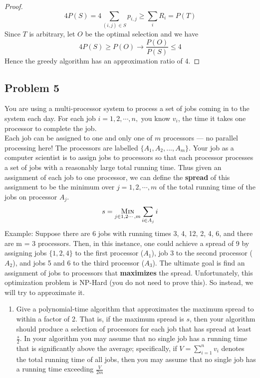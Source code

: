 \documentclass[11pt]{article}
\begin{document}
\begin{enumerate}
\begin{proof}
        \[
            4P(S) = 4\sum_{(i,j)\in S} p_{i,j} \geq \sum_{i} R_i = P(T)
        \]
        Since $T$ is arbitrary, let $O$ be the optimal selection and we have 
        \[
            4P(S) \geq P(O) \to \frac{P(O)}{P(S)} \leq 4
        \]
        Hence the greedy algorithm has an approximation ratio of 4.
    \end{proof}
\end{enumerate}


\subsection*{Problem 5}


You are using a multi-processor system to process a set of jobs coming in to the system each day. For each job $i = 1,2,\cdots ,n,$ you know $v_i$, the time it takes one processor to complete the job. \\ 
Each job can be assigned to one and only one of $m$ processors — no parallel processing here! The processors are labelled $\{A_1,A_2,...,A_m\}$. Your job as a computer scientist is to assign jobs to processors so that each processor processes a set of jobs with a reasonably large total running time. Thus given an assignment of each job to one processor, we can define the \textbf{spread} of this assignment to be the minimum over $j = 1,2,\cdots ,m$ of the total running time of the jobs on processor $A_j$.
\[
    s = \underset{j\in 1,2\cdots, m}{\textsc{Min}} \sum_{i\in A_j} i
\]
Example: Suppose there are 6 jobs with running times 3, 4, 12, 2, 4, 6, and there are m = 3 processors. Then, in this instance, one could achieve a spread of 9 by assigning jobs $\{1, 2, 4\}$ to the first processor ($A_1$), job 3 to the second processor ($A_2$), and jobs 5 and 6 to the third processor ($A_3$).
The ultimate goal is find an assignment of jobs to processors that \textbf{maximizes} the spread. Unfortunately, this optimization problem is NP-Hard (you do not need to prove this). So instead, we will try to approximate it.

\begin{enumerate}
    \item Give a polynomial-time algorithm that approximates the maximum spread to within a factor of 2. That is, if the maximum spread is $s$, then your algorithm should produce a selection of processors for each job that has spread at least $\frac{s}{2}$. In your algorithm you may assume that no single job has a running time that is significantly above the average; specifically, if $V = \sum_{i=1}^n v_i$ denotes the total running time of all jobs, then you may assume that no single job has a running time exceeding $\frac{V}{2m}$
    \begin{solution}
        
    \end{solution}

\end{enumerate}
\end{document}
